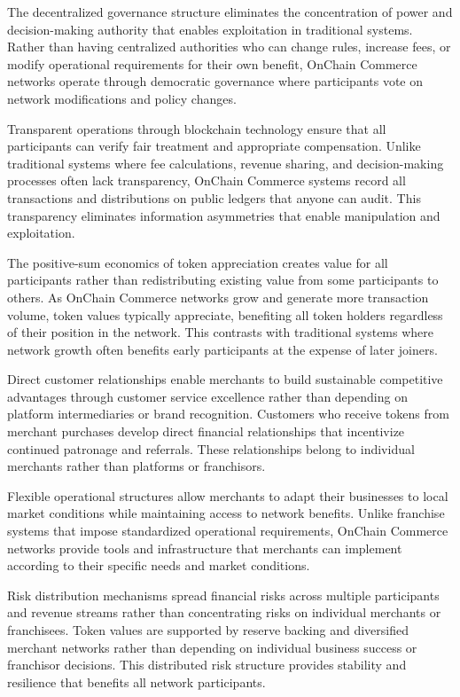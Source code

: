 \documentclass[
  Letterpaper,
]{scrbook}
\begin{document}
The decentralized governance structure eliminates the concentration of
power and decision-making authority that enables exploitation in
traditional systems. Rather than having centralized authorities who can
change rules, increase fees, or modify operational requirements for
their own benefit, OnChain Commerce networks operate through democratic
governance where participants vote on network modifications and policy
changes.

Transparent operations through blockchain technology ensure that all
participants can verify fair treatment and appropriate compensation.
Unlike traditional systems where fee calculations, revenue sharing, and
decision-making processes often lack transparency, OnChain Commerce
systems record all transactions and distributions on public ledgers that
anyone can audit. This transparency eliminates information asymmetries
that enable manipulation and exploitation.

The positive-sum economics of token appreciation creates value for all
participants rather than redistributing existing value from some
participants to others. As OnChain Commerce networks grow and generate
more transaction volume, token values typically appreciate, benefiting
all token holders regardless of their position in the network. This
contrasts with traditional systems where network growth often benefits
early participants at the expense of later joiners.

Direct customer relationships enable merchants to build sustainable
competitive advantages through customer service excellence rather than
depending on platform intermediaries or brand recognition. Customers who
receive tokens from merchant purchases develop direct financial
relationships that incentivize continued patronage and referrals. These
relationships belong to individual merchants rather than platforms or
franchisors.

Flexible operational structures allow merchants to adapt their
businesses to local market conditions while maintaining access to
network benefits. Unlike franchise systems that impose standardized
operational requirements, OnChain Commerce networks provide tools and
infrastructure that merchants can implement according to their specific
needs and market conditions.

Risk distribution mechanisms spread financial risks across multiple
participants and revenue streams rather than concentrating risks on
individual merchants or franchisees. Token values are supported by
reserve backing and diversified merchant networks rather than depending
on individual business success or franchisor decisions. This distributed
risk structure provides stability and resilience that benefits all
network participants.
\end{document}
